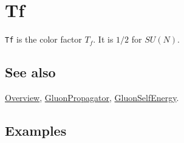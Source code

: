 \documentclass[../FeynCalcManual.tex]{subfiles}
\begin{document}
\begin{Shaded}
\begin{Highlighting}[]
 
\end{Highlighting}
\end{Shaded}

\hypertarget{tf}{
\section{Tf}\label{tf}}

\texttt{Tf} is the color factor \(T_f\). It is \(1/2\) for \(SU(N)\).

\subsection{See also}

\hyperlink{toc}{Overview}, \hyperlink{gluonpropagator}{GluonPropagator},
\hyperlink{gluonselfenergy}{GluonSelfEnergy}.

\subsection{Examples}
\end{document}
